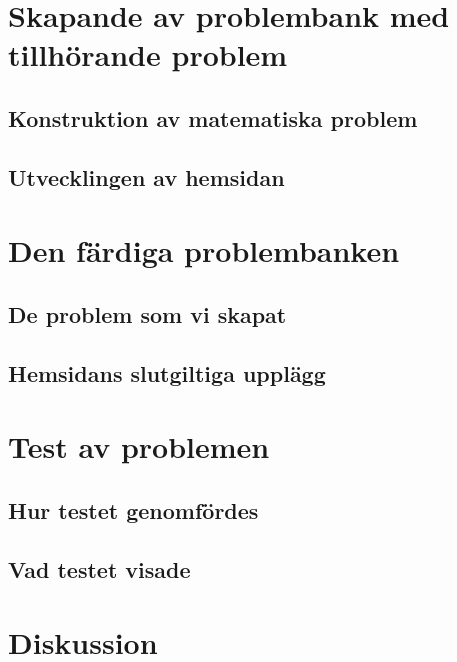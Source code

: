 \documentclass[11pt,a4paper]{article}
\begin{document}
\section{Skapande av problembank med tillhörande problem}
    \subsection{Konstruktion av matematiska problem}
    \label{sec:Skapandetavproblem}
        

    \subsection{Utvecklingen av hemsidan}
        
        
\section{Den färdiga problembanken}
        
    
    \subsection{De problem som vi skapat}
        
    
    \subsection{Hemsidans slutgiltiga upplägg}
        
    
\section{Test av problemen}
    
    \subsection{Hur testet genomfördes}
        
        
    \subsection{Vad testet visade}
    \label{sec:slutenkat}

\section{Diskussion}%
    
    
\end{document}
